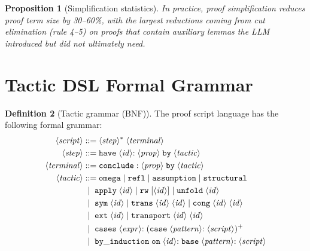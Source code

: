 \documentclass[11pt,a4paper]{report}
\theoremstyle{definition}
\newtheorem{definition}{Definition}[chapter]
\theoremstyle{plain}
\newtheorem{proposition}[definition]{Proposition}
\begin{document}
\begin{proposition}[Simplification statistics]
In practice, proof simplification reduces proof term size by 30--60\%, with
the largest reductions coming from cut elimination (rule 4--5) on proofs
that contain auxiliary lemmas the LLM introduced but did not ultimately need.
\end{proposition}


\section{Tactic DSL Formal Grammar}

\begin{definition}[Tactic grammar (BNF)]
\label{def:tactic-grammar}
The proof script language has the following formal grammar:
\begin{align}
\langle\mathit{script}\rangle &::= \langle\mathit{step}\rangle^* \; \langle\mathit{terminal}\rangle \notag\\
\langle\mathit{step}\rangle &::= \mathtt{have} \; \langle\mathit{id}\rangle \mathtt{:} \; \langle\mathit{prop}\rangle
  \; \mathtt{by} \; \langle\mathit{tactic}\rangle \notag\\
\langle\mathit{terminal}\rangle &::= \mathtt{conclude:} \; \langle\mathit{prop}\rangle
  \; \mathtt{by} \; \langle\mathit{tactic}\rangle \notag\\
\langle\mathit{tactic}\rangle &::= \mathtt{omega} \mid \mathtt{refl} \mid \mathtt{assumption}
  \mid \mathtt{structural} \notag\\
  &\;\mid\; \mathtt{apply} \; \langle\mathit{id}\rangle
  \mid \mathtt{rw} \; \mathtt{[}\langle\mathit{id}\rangle\mathtt{]}
  \mid \mathtt{unfold} \; \langle\mathit{id}\rangle \notag\\
  &\;\mid\; \mathtt{sym} \; \langle\mathit{id}\rangle
  \mid \mathtt{trans} \; \langle\mathit{id}\rangle \; \langle\mathit{id}\rangle
  \mid \mathtt{cong} \; \langle\mathit{id}\rangle \; \langle\mathit{id}\rangle \notag\\
  &\;\mid\; \mathtt{ext} \; \langle\mathit{id}\rangle
  \mid \mathtt{transport} \; \langle\mathit{id}\rangle \; \langle\mathit{id}\rangle \notag\\
  &\;\mid\; \mathtt{cases} \; \langle\mathit{expr}\rangle \mathtt{:}
    \; (\mathtt{case} \; \langle\mathit{pattern}\rangle \mathtt{:} \; \langle\mathit{script}\rangle)^+ \notag\\
  &\;\mid\; \mathtt{by\_induction} \; \mathtt{on} \; \langle\mathit{id}\rangle \mathtt{:}
    \; \mathtt{base} \; \langle\mathit{pattern}\rangle \mathtt{:} \; \langle\mathit{script}\rangle \notag\\

\end{align}
\end{definition}
\end{document}
